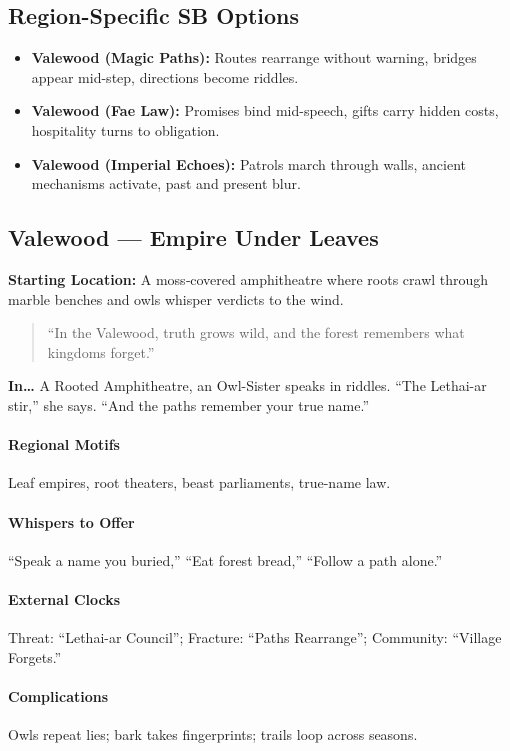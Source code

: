\subsection*{Region-Specific SB Options}
\begin{itemize}
\item \textbf{Valewood (Magic Paths):} Routes rearrange without warning, bridges appear mid-step, directions become riddles.
\item \textbf{Valewood (Fae Law):} Promises bind mid-speech, gifts carry hidden costs, hospitality turns to obligation.
\item \textbf{Valewood (Imperial Echoes):} Patrols march through walls, ancient mechanisms activate, past and present blur.
\end{itemize}


\subsection*{Valewood — Empire Under Leaves}
\textbf{Starting Location:} A moss‑covered amphitheatre where roots crawl through marble benches and owls whisper verdicts to the wind.
\begin{quote}
“In the Valewood, truth grows wild, and the forest remembers what kingdoms forget.”
\end{quote}

\textbf{In…} A Rooted Amphitheatre, an Owl-Sister speaks in riddles. ``The Lethai-ar stir,'' she says. ``And the paths remember your true name.''
\paragraph{Regional Motifs} Leaf empires, root theaters, beast parliaments, true-name law.
\paragraph{Whispers to Offer} ``Speak a name you buried,'' ``Eat forest bread,'' ``Follow a path alone.''
\paragraph{External Clocks} Threat: ``Lethai-ar Council''; Fracture: ``Paths Rearrange''; Community: ``Village Forgets.''
\paragraph{Complications} Owls repeat lies; bark takes fingerprints; trails loop across seasons.
